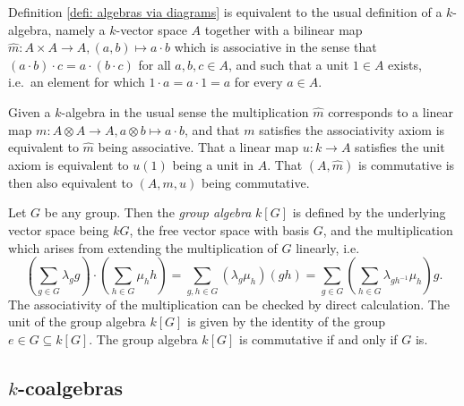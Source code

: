\begin{rem}
 Definition \ref{defi: algebras via diagrams} is equivalent to the usual definition of a $k$-algebra, namely a $k$-vector space $A$ together with a bilinear map $\hat{m} \colon A \times A \to A, (a,b) \mapsto a \cdot b$ which is associative in the sense that $(a \cdot b) \cdot c = a \cdot (b \cdot c)$ for all $a,b,c \in A$, and such that a unit $1 \in A$ exists, i.e.\ an element for which $1 \cdot a = a \cdot 1 = a$ for every $a \in A$.
 
 Given a $k$-algebra in the usual sense the multiplication $\hat{m}$ corresponds to a linear map $m \colon A \otimes A \to A, a \otimes b \mapsto a \cdot b$, and that $m$ satisfies the associativity axiom is equivalent to $\hat{m}$ being associative. That a linear map $u \colon k \to A$ satisfies the unit axiom is equivalent to $u(1)$ being a unit in $A$. That $(A,\hat{m})$ is commutative is then also equivalent to $(A,m,u)$ being commutative.
\end{rem}


\begin{expl}
 Let $G$ be any group. Then the \emph{group algebra} $k[G]$ is defined by the underlying vector space being $kG$, the free vector space with basis $G$, and the multiplication which arises from extending the multiplication of $G$ linearly, i.e.
 \[
  \left( \sum_{g \in G} \lambda_g g \right) \cdot \left( \sum_{h \in G} \mu_h h \right)
  = \sum_{g,h \in G} (\lambda_g \mu_h) (gh)
  = \sum_{g \in G} \left( \sum_{h \in G} \lambda_{gh^{-1}} \mu_h \right) g.
 \]
 The associativity of the multiplication can be checked by direct calculation. The unit of the group algebra $k[G]$ is given by the identity of the group $e \in G \subseteq k[G]$. The group algebra $k[G]$ is commutative if and only if $G$ is.
\end{expl}



\subsection{\texorpdfstring{$k$}{k}-coalgebras}



